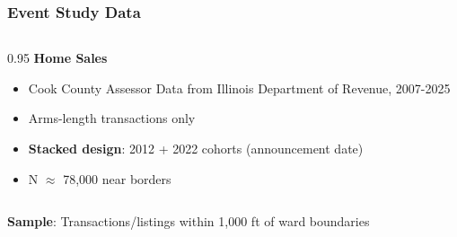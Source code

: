 \begin{frame}[label=event-data]
    \frametitle{Event Study Data}
    
    \begin{columns}[T]
    \begin{column}{0.95\textwidth}
    \textbf{Home Sales}
    \begin{itemize}
        \item Cook County Assessor Data from Illinois Department of Revenue, 2007-2025
        \item Arms-length transactions only
        \item \textbf{Stacked design}: 2012 + 2022 cohorts (announcement date)
        \item N $\approx$ 78,000 near borders
    \end{itemize}
    \end{column}
    \end{columns}
    
    \vspace{0.5em}
    \textbf{Sample}: Transactions/listings within 1,000 ft of ward boundaries
    
    \vfill\hfill
    \hyperlink{treatment-details}{}
\end{frame}


